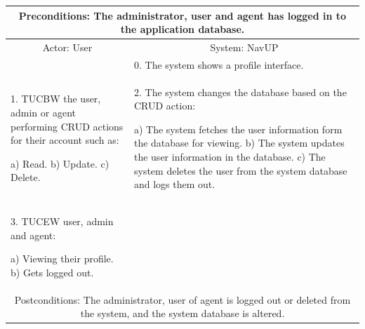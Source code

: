 ﻿\documentclass{article}
\begin{document}
       		 \begin{tabular}{|p{6cm}|p{6cm}|}
       		 \hline
       		\multicolumn{2}{c}{\parbox{12cm}{\vspace{2mm} Preconditions: The administrator, user and agent has logged in to the application database.\vspace{2mm}}} \\
       		 \hline
       		\multicolumn{1}{c}{Actor: User} & \multicolumn{1}{c}{ System: NavUP} \\
        		\hline
       		 &0.	The system shows a profile interface.\\
       		 \hline
       		1.	TUCBW the user, admin or agent performing CRUD actions for their account such as:

a)	Read.
b)	Update.
c)	Delete.
 & 2.	The system changes the database based on the CRUD action:

a)	The system fetches the user information form the database for viewing.
b)	The system updates the user information in the database.
c)	The system deletes the user from the system database and logs them out.

\\
        		\hline
       		3.	TUCEW user, admin and agent:

a)	Viewing their profile.
b)	Gets logged out.
&\\
       		 \hline
        		\multicolumn{2}{c}{\parbox{12cm}{\vspace{2mm}Postconditions: The administrator, user of agent is logged out or deleted from the system, and the system database is altered.\vspace{2mm}} } \\
        		\hline
        \end{tabular} 
        \endgroup
        
\end{document}
